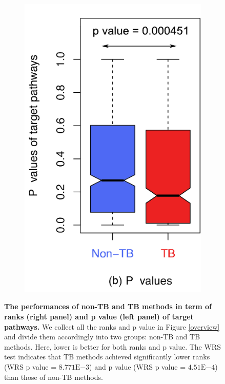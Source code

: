 \begin{figure}
\begin{subfigure}[b]{0.3\textwidth}
        \includegraphics[width=1\linewidth]{../Figures/Pvalue_NonTBvsTB}
                \label{pvalue}
        \end{subfigure}
        \caption{\textbf{The performances of non-TB and TB methods in term of ranks (right panel) and p value (left panel) of target pathways.} We collect all the ranks and p value in Figure \ref{overview} and divide them accordingly into two groups: non-TB and TB methods. Here, lower is better for both ranks and p value.    The  WRS test indicates that TB methods achieved significantly lower ranks (WRS p value = $8.771\mathrm{E}{-3}$) and p value (WRS p value = $4.51\mathrm{E}{-4}$) than those of non-TB methods.}
        \label{Fig:nonTBvsTB}
\end{figure}

